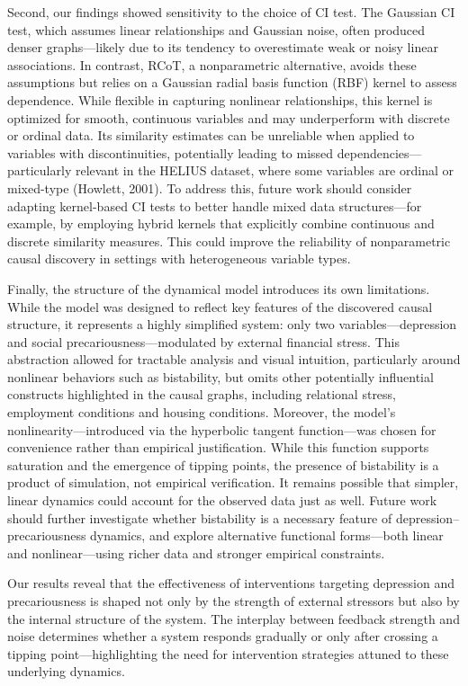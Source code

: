 \documentclass[
]{article}
\begin{document}
Second, our findings showed sensitivity to the choice of CI test. The
Gaussian CI test, which assumes linear relationships and Gaussian noise,
often produced denser graphs---likely due to its tendency to
overestimate weak or noisy linear associations. In contrast, RCoT, a
nonparametric alternative, avoids these assumptions but relies on a
Gaussian radial basis function (RBF) kernel to assess dependence. While
flexible in capturing nonlinear relationships, this kernel is optimized
for smooth, continuous variables and may underperform with discrete or
ordinal data. Its similarity estimates can be unreliable when applied to
variables with discontinuities, potentially leading to missed
dependencies---particularly relevant in the HELIUS dataset, where some
variables are ordinal or mixed-type (Howlett, 2001). To address this,
future work should consider adapting kernel-based CI tests to better
handle mixed data structures---for example, by employing hybrid kernels
that explicitly combine continuous and discrete similarity measures.
This could improve the reliability of nonparametric causal discovery in
settings with heterogeneous variable types.

Finally, the structure of the dynamical model introduces its own
limitations. While the model was designed to reflect key features of the
discovered causal structure, it represents a highly simplified system:
only two variables---depression and social precariousness---modulated by
external financial stress. This abstraction allowed for tractable
analysis and visual intuition, particularly around nonlinear behaviors
such as bistability, but omits other potentially influential constructs
highlighted in the causal graphs, including relational stress,
employment conditions and housing conditions. Moreover, the model's
nonlinearity---introduced via the hyperbolic tangent function---was
chosen for convenience rather than empirical justification. While this
function supports saturation and the emergence of tipping points, the
presence of bistability is a product of simulation, not empirical
verification. It remains possible that simpler, linear dynamics could
account for the observed data just as well. Future work should further
investigate whether bistability is a necessary feature of
depression--precariousness dynamics, and explore alternative functional
forms---both linear and nonlinear---using richer data and stronger
empirical constraints.

Our results reveal that the effectiveness of interventions targeting
depression and precariousness is shaped not only by the strength of
external stressors but also by the internal structure of the system. The
interplay between feedback strength and noise determines whether a
system responds gradually or only after crossing a tipping
point---highlighting the need for intervention strategies attuned to
these underlying dynamics.
\end{document}
